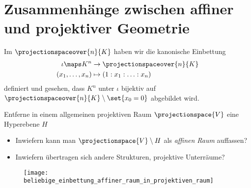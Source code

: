 \section{Zusammenhänge zwischen affiner und projektiver Geometrie}
\begin{motivation*}
  Im \( \projectionspaceover{n}{K} \) haben wir die kanonische Einbettung
  \begin{equation*}
    \begin{split}
      \iota\maps K^n&\to \projectionspaceover{n}{K}\\
      (x_1,\dotsc,x_n)&\mapsto (1:x_1:\dotsc:x_n)
    \end{split}
  \end{equation*}
  definiert und gesehen, dass \( K^n \) unter \( \iota \) bijektiv auf \( \projectionspaceover{n}{K}\setminus \set{x_0=0} \) abgebildet wird.
\end{motivation*}
\begin{frage*}
  Entferne in einem allgemeinen projektiven Raum \( \projectionspace{V} \) eine Hyperebene \( H \)
  \begin{itemize}
    \item Inwiefern kann man \( \projectionspace{V}\setminus H \) als \emph{affinen Raum} auffassen?
    \item Inwiefern übertragen sich andere Strukturen, \zb projektive Unterräume?
  \end{itemize}
\end{frage*}
\begin{figure}[H]
  \centering
  \texttt{[image: beliebige\_einbettung\_affiner\_raum\_in\_projektiven\_raum]}
  \label{fig:beliebige_einbettung_affiner_raum_in_projektiven_raum}
\end{figure}
